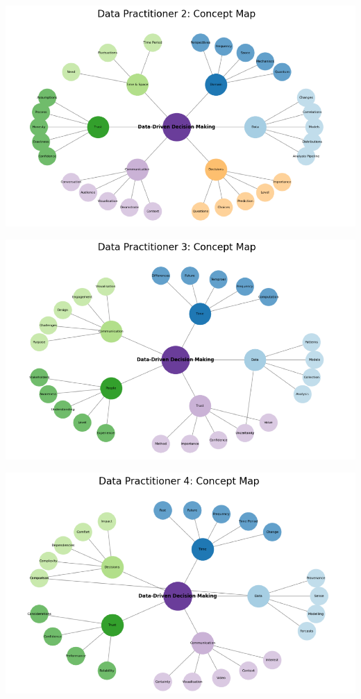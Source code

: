 \documentclass{article}
\begin{document}
\includegraphics{210431461_CSC8639_Dissertation_files/figure-latex/unnamed-chunk-14-1.pdf}

\includegraphics{210431461_CSC8639_Dissertation_files/figure-latex/unnamed-chunk-15-1.pdf}

\includegraphics{210431461_CSC8639_Dissertation_files/figure-latex/unnamed-chunk-16-1.pdf}
\end{document}
